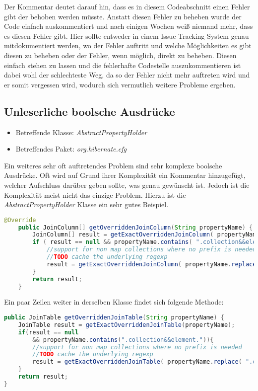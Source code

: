 Der Kommentar deutet darauf hin, dass es in diesem Codeabschnitt einen Fehler gibt der behoben werden müsste. Anstatt diesen Fehler zu beheben wurde der Code einfach auskommentiert und nach einigen Wochen weiß niemand mehr, dass es diesen Fehler gibt. Hier sollte entweder in einem Issue Tracking System genau mitdokumentiert werden, wo der Fehler auftritt und welche Möglichkeiten es gibt diesen zu beheben oder der Fehler, wenn möglich, direkt zu beheben. Diesen einfach stehen zu lassen und die fehlerhafte Codestelle auszukommentieren ist dabei wohl der schlechteste Weg, da so der Fehler nicht mehr auftreten wird und er somit vergessen wird, wodurch sich vermutlich weitere Probleme ergeben.
 
\subsection{Unleserliche boolsche Ausdrücke}
\label{cha:BadBoolStatements}
\begin{itemize}
	\item Betreffende Klasse: \textit{AbstractPropertyHolder}
	\item Betreffendes Paket: \textit{org.hibernate.cfg}
\end{itemize}

\SuperPar Ein weiteres sehr oft auftretendes Problem sind sehr komplexe boolsche Ausdrücke. Oft wird auf Grund ihrer Komplexität ein Kommentar hinzugefügt, welcher Aufschluss darüber geben sollte, was genau gewünscht ist. Jedoch ist die Komplexität meist nicht das einzige Problem. Hierzu ist die \textit{AbstractPropertyHolder} Klasse ein sehr gutes Beispiel.

\begin{lstlisting}[language=Java, caption=Komplexe boolsche Ausdrücke 1 Zeile 255 - 264, label=lst:GetByPredicate]
	@Override
	public JoinColumn[] getOverriddenJoinColumn(String propertyName) {
		JoinColumn[] result = getExactOverriddenJoinColumn( propertyName );
		if ( result == null && propertyName.contains( ".collection&&element." ) ) {
			//support for non map collections where no prefix is needed
			//TODO cache the underlying regexp
			result = getExactOverriddenJoinColumn( propertyName.replace( ".collection&&element.", "."  ) );
		}
		return result;
	}
\end{lstlisting}

Ein paar Zeilen weiter in derselben Klasse findet sich folgende Methode:

\begin{lstlisting}[language=Java, caption=Komplexe boolsche Ausdrücke 2 Zeile 305 - 313, label=lst:GetByPredicate]
public JoinTable getOverriddenJoinTable(String propertyName) {
	JoinTable result = getExactOverriddenJoinTable(propertyName);
	if(result == null 
		&& propertyName.contains(".collection&&element.")){
		//support for non map collections where no prefix is needed
		//TODO cache the underlying regexp
		result = getExactOverriddenJoinTable( propertyName.replace( ".collection&&element.", "."  ) );
	}
	return result;
}
\end{lstlisting}

